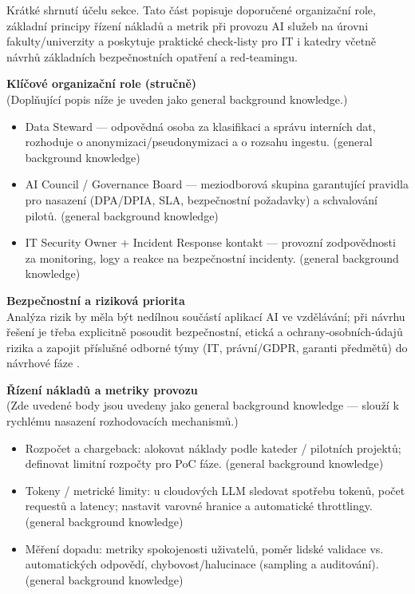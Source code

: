 \documentclass{report}%
\begin{document}
%

Krátké shrnutí účelu sekce. Tato část popisuje doporučené organizační role, základní principy řízení nákladů a metrik při provozu AI služeb na úrovni fakulty/univerzity a poskytuje praktické check‑listy pro IT i katedry včetně návrhů základních bezpečnostních opatření a red‑teamingu.

\medskip

\textbf{Klíčové organizační role (stručně)} \\
(Doplňující popis níže je uveden jako general background knowledge.)
\begin{itemize}
  \item Data Steward — odpovědná osoba za klasifikaci a správu interních dat, rozhoduje o anonymizaci/pseudonymizaci a o rozsahu ingestu. (general background knowledge)
  \item AI Council / Governance Board — meziodborová skupina garantující pravidla pro nasazení (DPA/DPIA, SLA, bezpečnostní požadavky) a schvalování pilotů. (general background knowledge)
  \item IT Security Owner + Incident Response kontakt — provozní zodpovědnosti za monitoring, logy a reakce na bezpečnostní incidenty. (general background knowledge)
\end{itemize}

\medskip

\textbf{Bezpečnostní a riziková priorita} \\
Analýza rizik by měla být nedílnou součástí aplikací AI ve vzdělávání; při návrhu řešení je třeba explicitně posoudit bezpečnostní, etická a ochrany‑osobních‑údajů rizika a zapojit příslušné odborné týmy (IT, právní/GDPR, garanti předmětů) do návrhové fáze \cite{kb_malinka_chatgpt_ve_vyuce_dva_roky_pote_2024_pdf_90bc3aaf_page_12_1}. 

\medskip

\textbf{Řízení nákladů a metriky provozu} \\
(Zde uvedené body jsou uvedeny jako general background knowledge — slouží k rychlému nasazení rozhodovacích mechanismů.)
\begin{itemize}
  \item Rozpočet a chargeback: alokovat náklady podle kateder / pilotních projektů; definovat limitní rozpočty pro PoC fáze. (general background knowledge)
  \item Tokeny / metrické limity: u cloudových LLM sledovat spotřebu tokenů, počet requestů a latency; nastavit varovné hranice a automatické throttlingy. (general background knowledge)
  \item Měření dopadu: metriky spokojenosti uživatelů, poměr lidské validace vs. automatických odpovědí, chybovost/halucinace (sampling a auditování). (general background knowledge)
\end{itemize}
\end{document}

